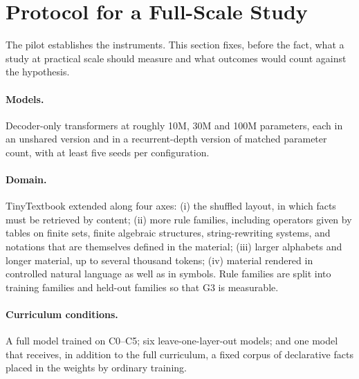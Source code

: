 \documentclass[11pt]{article}
\begin{document}
\section{Protocol for a Full-Scale Study}
\label{sec:protocol}

The pilot establishes the instruments.
This section fixes, before the fact, what a study at practical scale should measure and what outcomes would count against the hypothesis.

\paragraph{Models.}
Decoder-only transformers at roughly 10M, 30M and 100M parameters, each in an unshared version and in a recurrent-depth version of matched parameter count, with at least five seeds per configuration.

\paragraph{Domain.}
TinyTextbook extended along four axes: (i) the shuffled layout, in which facts must be retrieved by content; (ii) more rule families, including operators given by tables on finite sets, finite algebraic structures, string-rewriting systems, and notations that are themselves defined in the material; (iii) larger alphabets and longer material, up to several thousand tokens; (iv) material rendered in controlled natural language as well as in symbols.
Rule families are split into training families and held-out families so that G3 is measurable.

\paragraph{Curriculum conditions.}
A full model trained on C0--C5; six leave-one-layer-out models; and one model that receives, in addition to the full curriculum, a fixed corpus of declarative facts placed in the weights by ordinary training.
\end{document}

